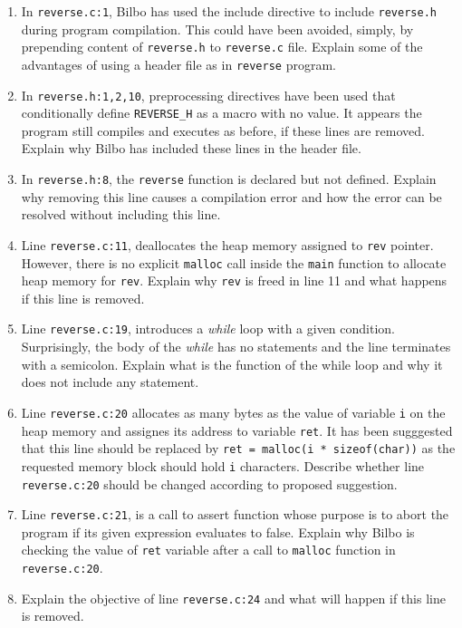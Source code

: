 \begin{enumerate}
\item
In \texttt{reverse.c:1}, Bilbo has used the include directive to include \texttt{reverse.h} during program compilation.
This could have been avoided, simply, by prepending content of \texttt{reverse.h} to \texttt{reverse.c} file.
Explain some of the advantages of using a header file as in \texttt{reverse} program.

\item
In \texttt{reverse.h:1,2,10}, preprocessing directives have been used that conditionally define \texttt{REVERSE\_H} as a macro with no value.
It appears the program still compiles and executes as before, if these lines are removed.
Explain why Bilbo has included these lines in the header file.

\item
In \texttt{reverse.h:8}, the \texttt{reverse} function is declared but not defined.
Explain why removing this line causes a compilation error and how the error can be resolved without including this line.

\item
Line \texttt{reverse.c:11}, deallocates the heap memory assigned to \texttt{rev} pointer.
However, there is no explicit \texttt{malloc} call inside the \texttt{main} function to allocate heap memory for \texttt{rev}.
Explain why \texttt{rev} is freed in line 11 and what happens if this line is removed.

\item
Line \texttt{reverse.c:19}, introduces a \textit{while} loop with a given condition.
Surprisingly, the body of the \textit{while} has no statements and the line terminates with a semicolon.
Explain what is the function of the while loop and why it does not include any statement.

\item
Line \texttt{reverse.c:20} allocates as many bytes as the value of variable \texttt{i} on the heap memory and assignes its address to variable \texttt{ret}.
It has been sugggested that this line should be replaced by \texttt{ret = malloc(i * sizeof(char))} as the requested memory block should hold \texttt{i} characters.
Describe whether line \texttt{reverse.c:20} should be changed according to proposed suggestion.

\item
Line \texttt{reverse.c:21}, is a call to assert function whose purpose is to abort the program if its given expression evaluates to false.
Explain why Bilbo is checking the value of \texttt{ret} variable after a call to \texttt{malloc} function in \texttt{reverse.c:20}.

\item
Explain the objective of line \texttt{reverse.c:24} and what will happen if this line is removed.
\end{enumerate}
